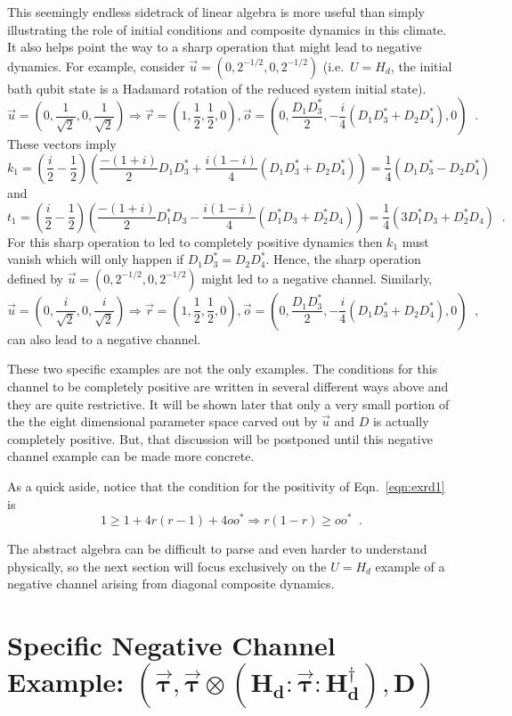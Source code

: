This seemingly endless sidetrack of linear algebra is more useful than simply illustrating the role of initial conditions and composite dynamics in this climate.  It also helps point the way to a sharp operation that might lead to negative dynamics.  For example, consider $\vec{u}=(0,2^{-1/2},0,2^{-1/2})$ (i.e.\ $U=H_d$, the initial bath qubit state is a Hadamard rotation of the reduced system initial state).  
$$
\vec{u} = \left(0,\frac{1}{\sqrt{2}},0,\frac{1}{\sqrt{2}}\right) \Rightarrow \vec{r} = \left(1,\frac{1}{2},\frac{1}{2},0\right),\vec{o}=\left(0,\frac{D_1D_3^*}{2},-\frac{i}{4}\left(D_1D_3^*+D_2D_4^*\right),0\right)\;\;.
$$
These vectors imply 
$$
k_1 = \left(\frac{i}{2}-\frac{1}{2}\right)\left(\frac{-(1+i)}{2}D_1D_3^*+\frac{i(1-i)}{4}\left(D_1D_3^*+D_2D_4^*\right)\right) = \frac{1}{4} \left(D_1 D_3^* - D_2 D_4^*\right)
$$
and
$$
t_1 = \left(\frac{i}{2}-\frac{1}{2}\right)\left(\frac{-(1+i)}{2}D_1^* D_3-\frac{i(1-i)}{4}\left(D_1^*D_3+D_2^*D_4\right)\right) = \frac{1}{4} \left(3 D_1^* D_3 + D_2^* D_4\right)\;\;.
$$
For this sharp operation to led to completely positive dynamics then $k_1$ must vanish which will only happen if $D_1D_3^*=D_2D_4^*$.  Hence, the sharp operation defined by $\vec{u}=(0,2^{-1/2},0,2^{-1/2})$ might led to a negative channel.  Similarly,
$$
\vec{u} = \left(0,\frac{i}{\sqrt{2}},0,\frac{i}{\sqrt{2}}\right) \Rightarrow \vec{r} = \left(1,\frac{1}{2},\frac{1}{2},0\right),\vec{o}=\left(0,\frac{D_1D_3^*}{2},-\frac{i}{4}\left(D_1D_3^*+D_2D_4^*\right),0\right)\;\;,
$$
can also lead to a negative channel.  

These two specific examples are not the only examples.  The conditions for this channel to be completely positive are written in several different ways above and they are quite restrictive.  It will be shown later that only a very small portion of the the eight dimensional parameter space carved out by $\vec{u}$ and $D$ is actually completely positive.  But, that discussion will be postponed until this negative channel example can be made more concrete.  

As a quick aside, notice that the condition for the positivity of Eqn.\ \ref{eqn:exrd1} is
$$
1 \ge 1 + 4 r(r-1) + 4 o o^*\Rightarrow r(1-r)\ge oo^*\;\;.
$$

The abstract algebra can be difficult to parse and even harder to understand physically, so the next section will focus exclusively on the $U=H_d$ example of a negative channel arising from diagonal composite dynamics.  

\section{Specific Negative Channel Example: $\mathbf{(\vec{\tau},\vec{\tau}\otimes \left( H_d:\vec{\tau}:H_d^\dagger\right),D)}$}
\label{sec:negexample}

